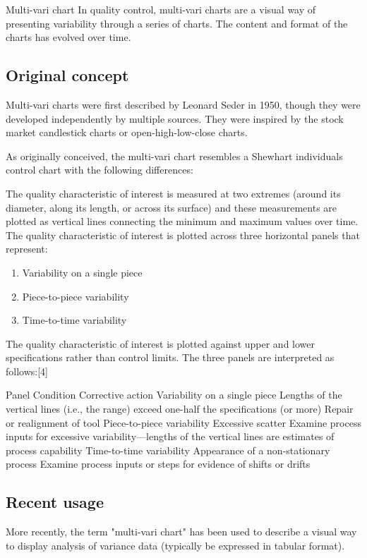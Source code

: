 Multi-vari chart
In quality control, multi-vari charts are a visual way of presenting variability through a series of charts. The content and format of the charts has evolved over time.

\subsection*{Original concept}
Multi-vari charts were first described by Leonard Seder in 1950, though they were developed independently by multiple sources. They were inspired by the stock market candlestick charts or open-high-low-close charts.

As originally conceived, the multi-vari chart resembles a Shewhart individuals control chart with the following differences:

The quality characteristic of interest is measured at two extremes (around its diameter, along its length, or across its surface) and these measurements are plotted as vertical lines connecting the minimum and maximum values over time.
The quality characteristic of interest is plotted across three horizontal panels that represent:
\begin{enumerate}
\item Variability on a single piece
\item Piece-to-piece variability
\item Time-to-time variability
\end{enumerate}
The quality characteristic of interest is plotted against upper and lower specifications rather than control limits.
The three panels are interpreted as follows:[4]

Panel	Condition	Corrective action
Variability on a single piece	Lengths of the vertical lines (i.e., the range) exceed one-half the specifications (or more)	Repair or realignment of tool
Piece-to-piece variability	Excessive scatter	Examine process inputs for excessive variability—lengths of the vertical lines are estimates of process capability
Time-to-time variability	Appearance of a non-stationary process	Examine process inputs or steps for evidence of shifts or drifts

\subsection{Recent usage}
More recently, the term "multi-vari chart" has been used to describe a visual way to display analysis of variance data (typically be expressed in tabular format). 

